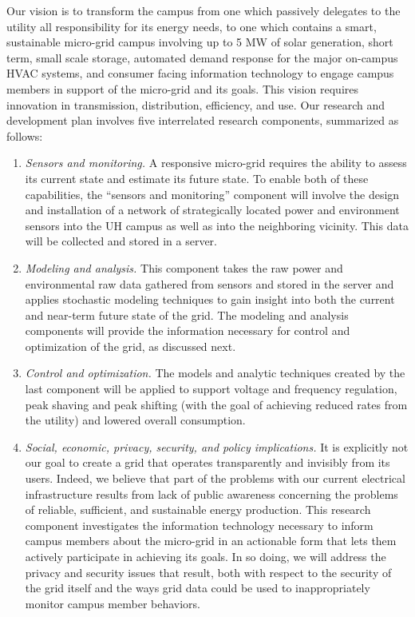 Our vision is to transform the campus from one which passively delegates to
the utility all responsibility for its energy needs, to one which contains
a smart, sustainable micro-grid campus involving up to 5 MW of solar
generation, short term, small scale storage, automated demand response for
the major on-campus HVAC systems, and consumer facing information
technology to engage campus members in support of the micro-grid and its
goals.  This vision requires innovation in transmission, distribution,
efficiency, and use.  Our research and development plan involves five
interrelated research components, summarized as follows:

\begin{enumerate}

\item {\em Sensors and monitoring.} A responsive micro-grid requires the
  ability to assess its current state and estimate its future state.  To
  enable both of these capabilities, the ``sensors and monitoring''
  component will involve the design and installation of a network of
  strategically located power and environment sensors into the UH campus as
  well as into the neighboring vicinity. This data will be collected and
  stored in a server.

\item {\em Modeling and analysis.}  This component takes the raw power and
  environmental raw data gathered from sensors and stored in the server and
  applies stochastic modeling techniques to gain insight into both the
  current and near-term future state of the grid.  The modeling and
  analysis components will provide the information necessary for control
  and optimization of the grid, as discussed next.

\item {\em Control and optimization.}  The models and analytic techniques
  created by the last component will be applied to support voltage and
  frequency regulation, peak shaving and peak shifting (with the goal of
  achieving reduced rates from the utility) and lowered overall
  consumption. 

\item {\em Social, economic, privacy, security, and policy implications.}
  It is explicitly not our goal to create a grid that operates
  transparently and invisibly from its users.  Indeed, we believe that part
  of the problems with our current electrical infrastructure results from
  lack of public awareness concerning the problems of reliable, sufficient,
  and sustainable energy production.  This research component investigates
  the information technology necessary to inform campus members about the
  micro-grid in an actionable form that lets them actively participate in
  achieving its goals.  In so doing, we will address the privacy and
  security issues that result, both with respect to the security of the
  grid itself and the ways grid data could be used to inappropriately
  monitor campus member behaviors.


\end{enumerate}
